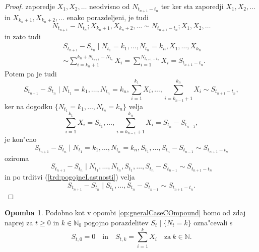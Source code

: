 \documentclass[12pt, a4paper, reqno]{amsart}
\theoremstyle{definition}
\newtheorem{opomba}[definicija]{Opomba}
\theoremstyle{plain}
\newcommand{\N}{\mathbb{N}}
\newcommand{\1}{\mathds{1}}
\begin{document}
\begin{proof}
            zaporedje $X_1, X_2, \dots$ neodvisno od $N_{t_{n+1} - t_n}$ ter ker sta zaporedji 
            $X_1, X_2, \dots$ in $X_{k_n + 1}, X_{k_n + 2}, \dots$ enako porazdeljeni, je tudi 
            \begin{equation*}
                N_{t_{n+1}} - N_{t_n}; X_{k_n + 1}, X_{k_n + 2}, \dots \sim N_{t_{n+1} - t_n}; X_1, X_2, \dots
            \end{equation*}
            in zato tudi 
            \begin{align*}
                &S_{t_{n+1}} - S_{t_n} \mid N_{t_1} = k_1, \dots, N_{t_n} = k_n, X_1, \dots, X_{k_n} \\
                &\sim \sum_{i = k_n + 1}^{k_n + N_{t_{n+1}} - N_{t_n}}X_i 
                = \sum_{i = 1}^{N_{t_{n+1} - t_n}}X_i = S_{t_{n+1} - t_n}.
            \end{align*}
            Potem pa je tudi
            \begin{equation*}
                S_{t_{n+1}} - S_{t_n}\mid N_{t_1} = k_1, \dots, N_{t_n} = k_n, \sum_{i=1}^{k_1}X_i, \dots, \sum_{i=k_{n-1} + 1}^{k_n}X_i \sim S_{t_{n+1} - t_n}, 
            \end{equation*}
            ker na dogodku $\{N_{t_1} = k_1, \dots, N_{t_n} = k_n\}$ velja 
            \begin{equation*}
                \sum_{i=1}^{k_1}X_i = S_{t_1}, \dots, \sum_{i=k_{n-1} + 1}^{k_n}X_i = S_{t_n} - S_{t_{n-1}},
            \end{equation*}
            je kon"cno 
            \begin{equation*}
                S_{t_{n+1}} - S_{t_n}\mid N_{t_1} = k_1, \dots, N_{t_n} = k_n, S_{t_1}, \dots, S_{t_n} - S_{t_{n-1}} \sim S_{t_{n+1} - t_n}
            \end{equation*}
            oziroma 
            \begin{equation*}
                S_{t_{n+1}} - S_{t_n}\mid N_{t_1}, \dots, N_{t_n}, S_{t_1}, \dots, S_{t_n} - S_{t_{n-1}} \sim S_{t_{n+1} - t_n}
            \end{equation*}
            in po trditvi (\ref{trd:pogojneLastnosti}) velja
            \begin{equation*}
                S_{t_{n+1}} - S_{t_n}\mid S_{t_1}, \dots, S_{t_n} - S_{t_{n-1}} \sim S_{t_{n+1} - t_n}.
            \end{equation*}
        \end{proof}

        \begin{opomba}
            Podobno kot v opombi \ref{op:gneralCaseCOmpound} bomo od zdaj naprej za $t\geq0$ in  $k\in\N_0$  
            pogojno porazdelitev $S_t \mid \{N_t = k\}$ ozna"cevali s
            \begin{equation*}
                S_{t, 0} = 0 \quad \text{in} \quad S_{t, k} = \sum_{i=1}^kX_i \quad \text{za} \ k\in\N.
            \end{equation*}
        \end{opomba}
\end{document}
